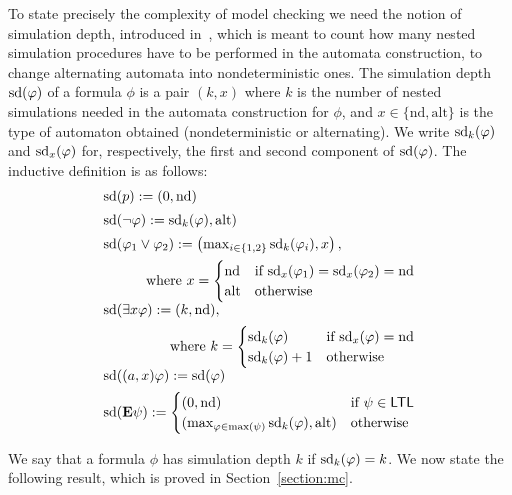 To state precisely the complexity of model checking \SLref we need the
 notion of simulation depth, introduced in~\cite{berthon2020strategy},
 which is meant to count how many nested simulation procedures have to
 be performed in the automata construction, to change alternating
 automata into nondeterministic ones. The simulation depth
 $\mbox{sd}(\varphi)$ of a formula $\phi$ is a pair $(k,x)$ where $k$ is the
 number of nested simulations needed in the automata construction for
 $\phi$, and $x\in\{\text{nd},\text{alt}\}$ is the type of automaton
 obtained (nondeterministic or alternating). We write $\mbox{sd}_k(\varphi)$
 and $\mbox{sd}_x(\varphi)$ for, respectively, the first and second component of $\mbox{sd}(\varphi)$.
 The inductive definition is as follows:
      \[
        \begin{array}{l}%
          \ndd(p) \egdef (0,\nd)\\[5pt]
          \ndd(\neg \phi) \egdef \ndd_k(\phi),\alt)\\[5pt]
          \ndd(\phi_1\ou\phi_2) \egdef \left
          (\max_{i\in\{1,2\}}\ndd_k(\phi_i), x \right ),\\[5pt]
          \hfill \mbox{where
          }x=    \begin{cases}
            \nd & \mbox{if }\ndd_x(\phi_1)=\ndd_x(\phi_2)=\nd\\
            \alt & \mbox{otherwise}
          \end{cases}
          \\[5pt]
          \ndd( \exists\var\phi)\egdef (k,\nd),\\[5pt]
          \hfill \mbox{where }
          k=\begin{cases}
            \ndd_k(\phi) & \mbox{if }\ndd_x(\phi)=\nd \\
            \ndd_k(\phi)+1 & \mbox{otherwise}
          \end{cases} \\[5pt]
          \ndd(\bind{\var}\phi) \egdef \ndd(\phi)\\[5pt]
          \ndd(\Eout\psi)\egdef
          \begin{cases}
            (0,\nd) &\mbox{if }\psi\in\LTL\\
            (\max_{\phi\in\max(\psi)}\ndd_k(\phi),\alt) &\mbox{otherwise}
          \end{cases}                                                        
        \end{array}
      \]

We say that a formula $\phi$ has simulation depth $k$ if
$\mbox{sd}_k(\varphi)=k$.  We now state the following result, which is proved
in Section~\ref{section:mc}.

